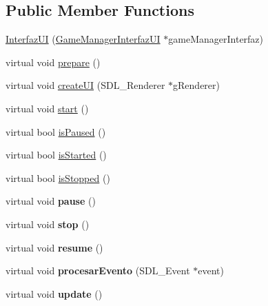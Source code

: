 \subsection*{Public Member Functions}
\begin{DoxyCompactItemize}
\item 
\hyperlink{class_interfaz_u_i_aa6578b54c6ff801c9757ea6b9fdfba18}{Interfaz\+UI} (\hyperlink{class_game_manager_interfaz_u_i}{Game\+Manager\+Interfaz\+UI} $\ast$game\+Manager\+Interfaz)
\item 
virtual void \hyperlink{class_interfaz_u_i_a312ba3176f7778589cd67f1828682012}{prepare} ()
\item 
virtual void \hyperlink{class_interfaz_u_i_a9dd59265e0790f06862fdfb12494767e}{create\+UI} (S\+D\+L\+\_\+\+Renderer $\ast$g\+Renderer)
\item 
virtual void \hyperlink{class_interfaz_u_i_a2a80214a4387c21c34a617a8a96996ca}{start} ()
\item 
virtual bool \hyperlink{class_interfaz_u_i_aa733a6aaaafc47daabae6a3156b97e18}{is\+Paused} ()
\item 
virtual bool \hyperlink{class_interfaz_u_i_a46a55209d8216f9afcc52313aacd6083}{is\+Started} ()
\item 
virtual bool \hyperlink{class_interfaz_u_i_a6514cf3d3d8c8d3faf01ee917ab0d4c1}{is\+Stopped} ()
\item 
virtual void {\bfseries pause} ()\hypertarget{class_interfaz_u_i_a1f20c514d5b0fd3965d5a1beb737f14c}{}\label{class_interfaz_u_i_a1f20c514d5b0fd3965d5a1beb737f14c}

\item 
virtual void {\bfseries stop} ()\hypertarget{class_interfaz_u_i_a64b64ee8944584ffbb3e478ab91ab280}{}\label{class_interfaz_u_i_a64b64ee8944584ffbb3e478ab91ab280}

\item 
virtual void {\bfseries resume} ()\hypertarget{class_interfaz_u_i_a9aaf3c1c5e7b46e791db0939deaaf15c}{}\label{class_interfaz_u_i_a9aaf3c1c5e7b46e791db0939deaaf15c}

\item 
virtual void {\bfseries procesar\+Evento} (S\+D\+L\+\_\+\+Event $\ast$event)\hypertarget{class_interfaz_u_i_adda39beb91f3089dd32d66ff2a5cea23}{}\label{class_interfaz_u_i_adda39beb91f3089dd32d66ff2a5cea23}

\item 
virtual void {\bfseries update} ()\hypertarget{class_interfaz_u_i_aac531d5813cbf9d7595c8c908ab3fbbc}{}\label{class_interfaz_u_i_aac531d5813cbf9d7595c8c908ab3fbbc}


\end{DoxyCompactItemize}
